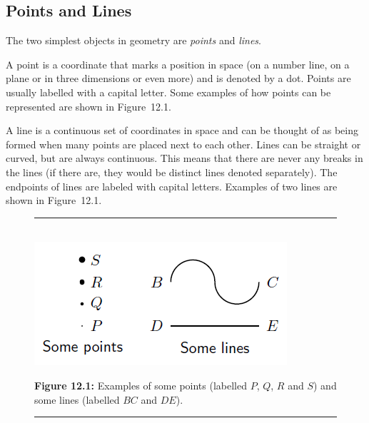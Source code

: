             \subsection{ Points and Lines}
            \nopagebreak
      \label{m39370*id313683}The two simplest objects in geometry are \textsl{points} and \textsl{lines}.\par 
      \label{m39370*id313697}A point is a coordinate that marks a position in space (on a number line, on a plane or in three dimensions or even more) and is denoted by a dot. Points are usually labelled with a capital letter. Some examples of how points can be represented are shown in Figure~12.1.\par 
      \label{m39370*id313707}A line is a continuous set of coordinates in space and can be thought of as being formed when many points are placed next to each other. Lines can be straight or curved, but are always continuous. This means that there are never any breaks in the lines (if there are, they would be distinct lines denoted separately). The endpoints of lines are labeled with capital letters. Examples of two lines are shown in Figure~12.1.\par 
    \setcounter{subfigure}{0}
	\begin{figure}[H] %
    \begin{center}
    \rule[.1in]{\figurerulewidth}{.005in} \\
        \label{m39370*uid7!!!underscore!!!media}\label{m39370*uid7!!!underscore!!!printimage}\includegraphics{col11306.imgs/m39370_MG10C13_001.png} %
      \vspace{2pt}
    \vspace{\rubberspace}\par \begin{cnxcaption}
	  \small \textbf{Figure 12.1: }Examples of some points (labelled $P$, $Q$, $R$ and $S$\hspace{1ex}) and some lines (labelled $BC$ and $DE$\hspace{1ex}).
	\end{cnxcaption}
    \vspace{.1in}
    \rule[.1in]{\figurerulewidth}{.005in} \\
    \end{center}
 \end{figure}       
